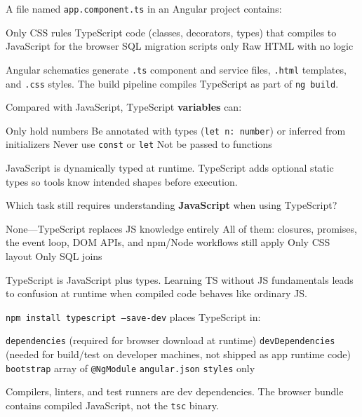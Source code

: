 \question[4]
A file named \texttt{app.component.ts} in an Angular project contains:
\begin{choices}
  \choice Only CSS rules
  \CorrectChoice TypeScript code (classes, decorators, types) that compiles to JavaScript for the browser
  \choice SQL migration scripts only
  \choice Raw HTML with no logic
\end{choices}
\begin{solution}
  Angular schematics generate \texttt{.ts} component and service files, \texttt{.html} templates, and \texttt{.css} styles. The build pipeline compiles TypeScript as part of \texttt{ng build}.
\end{solution}

\question[4]
Compared with JavaScript, TypeScript \textbf{variables} can:
\begin{choices}
  \choice Only hold numbers
  \CorrectChoice Be annotated with types (\lstinline[style=tsinline]|let n: number|) or inferred from initializers
  \choice Never use \lstinline[style=tsinline]|const| or \lstinline[style=tsinline]|let|
  \choice Not be passed to functions
\end{choices}
\begin{solution}
  JavaScript is dynamically typed at runtime. TypeScript adds optional static types so tools know intended shapes before execution.
\end{solution}

\question[4]
Which task still requires understanding \textbf{JavaScript} when using TypeScript?
\begin{choices}
  \choice None---TypeScript replaces JS knowledge entirely
  \CorrectChoice All of them: closures, promises, the event loop, DOM APIs, and npm/Node workflows still apply
  \choice Only CSS layout
  \choice Only SQL joins
\end{choices}
\begin{solution}
  TypeScript is JavaScript plus types. Learning TS without JS fundamentals leads to confusion at runtime when compiled code behaves like ordinary JS.
\end{solution}

\question[4]
\texttt{npm install typescript --save-dev} places TypeScript in:
\begin{choices}
  \choice \texttt{dependencies} (required for browser download at runtime)
  \CorrectChoice \texttt{devDependencies} (needed for build/test on developer machines, not shipped as app runtime code)
  \choice \texttt{bootstrap} array of \texttt{@NgModule}
  \choice \texttt{angular.json} \texttt{styles} only
\end{choices}
\begin{solution}
  Compilers, linters, and test runners are dev dependencies. The browser bundle contains compiled JavaScript, not the \texttt{tsc} binary.
\end{solution}

